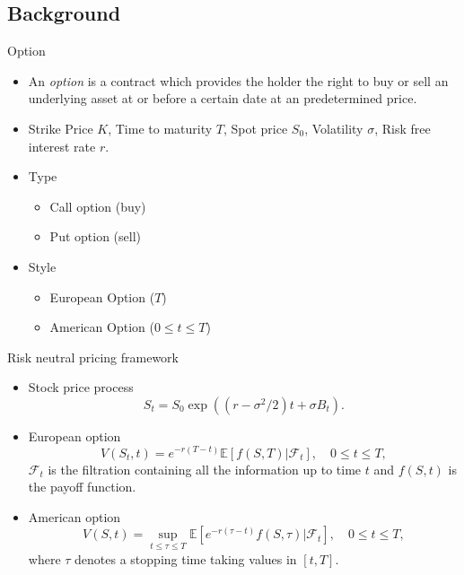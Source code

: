 \documentclass[cjk,10pt]{beamer}
\begin{document}
\subsection{Background}
\begin{frame}{Option}
\begin{itemize}
\item
An {\it option} is a contract which provides the holder the right to buy or sell an underlying asset at or before a certain date at an predetermined price.
\item
Strike Price $K$, Time to maturity $T$, Spot price $S_0$, Volatility $\sigma$, Risk free interest rate $r$. 
\item
Type
\begin{itemize}
\item
Call option (buy)
\item
Put option (sell)
\end{itemize}
\item
Style
\begin{itemize}
\item
European Option ($T$)
\item
American Option ($0\leq t \leq T$)
\end{itemize}
\end{itemize}
\end{frame}

\begin{frame}{Risk neutral pricing framework}
\begin{itemize}
\item
Stock price process
\begin{equation}
S_t=S_0\exp((r-\sigma^2 /2)t + \sigma B_t).
\end{equation}
\item
European option
\begin{equation}
V(S_t,t)=e^{-r(T-t)}\mathbb E[f(S,T)|\mathcal{F}_t], \quad 0\leq t\leq T,
\end{equation}
${\mathcal{F}_t}$ is the filtration containing all the information up to time $t$ and $f(S,t)$ is the payoff function.

\item
American option
\begin{equation}
V(S,t) =\sup_{t\leq \tau\leq  T}\mathbb E[e^{-r(\tau-t)}f(S,\tau)|\mathcal{F}_t], \quad 0\leq t\leq T,
\end{equation}
where $\tau$ denotes a stopping time taking values in $[t,T]$.
\end{itemize}
\end{frame}
\end{document}
